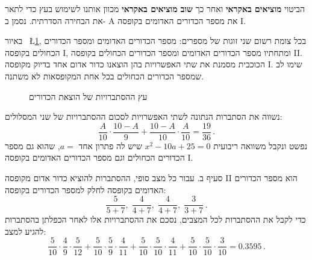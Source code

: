 \documentclass[12pt,a4paper]{article}
\begin{document}
הביטוי
\textbf{מוציאים באקראי}
ואחר כך
\textbf{שוב מוציאים באקראי}
מכוון אותנו לשימוש בעץ כדי לתאר את הבחירה הסדרתית. נסמן ב-%
\textsf{A}
את מספר הכדורים האדומים בקופסה 
\textsf{I}.

באיור~%
\L{\ref{fig.summer-2017b.1}},
בכל צומת רשום שני זוגות של מספרים: מספר הכדורים האדומים ומספר הכדורים הכחולים בקופסה
\textsf{I},
ומתחתיו מספר הכדורים האדומים ומספר הכדורים הכחולים בקופסה
\textsf{II}.
הכוכבית מסמנת את שתי האפשרויות בהן הוצאנו כדור אדום אחד בדיוק מקופסה
\textsf{I}.
שימו לב שמספר הכדורים הכחולים בכל אחת המקופסאות לא משתנה.
\begin{figure}
\begin{center}
\caption{עץ ההסתברויות של הוצאת הכדורים}\label{fig.summer-2017b.1}
\end{center}
\end{figure}
נשווה את הסתברות הנתונה לשתי האפשרויות לסכום ההסתברויות של שני המסלולים:
\[
\frac{A}{10}\cdot\frac{10-A}{9} + \frac{10-A}{10}\cdot\frac{A}{10} = \frac{19}{36}\,.
\]
נפשט ונקבל משוואה ריבועית 
$x^2-10a+25=0$
שיש לה פתרון אחד
$a=$,
שהוא גם מספר הכדורים הכחולים  וגם מספר הכדורים האדומים בקופסה
\textsf{I}.

סעיף ב. עבור כל מצב סופי, ההסתברות להוציא כדור אדום מקופסה
\textsf{II}
הוא מספר הכדורים האדומים בקופסה לחלק למספר הכדורים בקופסה:
\[
\frac{5}{5+7},\; \frac{4}{4+7},\; \frac{4}{4+7},\; \frac{3}{3+7}\,.
\]
כדי לקבל את ההסתברות לכל המצבים, נסכם את ההסתברויות אלו לאחר הכפלתן בהסתברות להגיע למצב:
\[
\frac{5}{10}\cdot\frac{4}{9}\cdot\frac{5}{12}+\frac{5}{10}\cdot\frac{5}{9}\cdot\frac{4}{11}+\frac{5}{10}\cdot\frac{5}{10}\cdot\frac{4}{11}+\frac{5}{10}\cdot\frac{5}{10}\cdot\frac{3}{10}=0.3595\,.
\]
\end{document}

